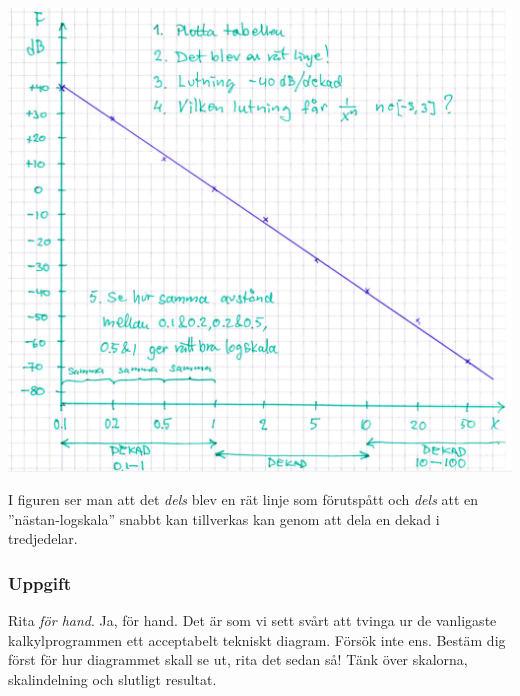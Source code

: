 \documentclass[onepage,swedish,a4paper,12pt]{scrbook}
\begin{document}
\begin{center}
\includegraphics[scale=0.5]{linlog.pdf}
\end{center}

I figuren ser man att det \emph{dels} blev en rät linje som förutspått  och \emph{dels} att en ''nästan-logskala'' snabbt kan tillverkas kan genom att dela en dekad i tredjedelar.


\subsubsection*{Uppgift}


Rita \emph{för hand}. Ja, för hand. Det är som vi sett svårt att tvinga ur de vanligaste kalkylprogrammen ett  acceptabelt tekniskt diagram. Försök inte ens. Bestäm dig först för hur diagrammet skall se ut, rita det sedan så! Tänk över skalorna, skalindelning och slutligt resultat.
\end{document}
